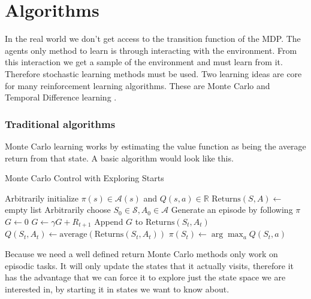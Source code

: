 \chapter{Algorithms}\label{C:algorithms}

In the real world we don't get access to the transition function of the MDP. The agents only method to learn is through interacting with the environment. From this interaction we get a sample of the environment and must learn from it. Therefore stochastic learning methods must be used. Two learning ideas are core for many reinforcement learning algorithms. These are Monte Carlo \cite{suttonReinforcementLearningSecond2018} and Temporal Difference learning \cite{suttonTemporalCreditAssignment1984} \cite{suttonLearningPredictMethods1988}.

\subsection{Traditional algorithms}

Monte Carlo learning works by estimating the value function as being the average return from that state.  A basic algorithm would look like this.

\begin{algorithm}
\caption{Monte Carlo Control with Exploring Starts}
\begin{algorithmic}[1]
\State Arbitrarily initialize $\pi(s) \in \mathcal{A}(s)$ and $Q(s,a) \in \mathbb{R}$
\State $\text{Returns}(S,A) \gets$ empty list
    \State Arbitrarily choose $S_0 \in \mathcal{S}, A_0 \in \mathcal{A}$
    \State Generate an episode by following $\pi$
    \State $G \gets 0$
        \State $G \gets \gamma G + R_{t+1}$
            \State Append $G$ to $\text{Returns}(S_t, A_t)$
            \State $Q(S_t, A_t) \gets \text{average}(\text{Returns}(S_t, A_t))$
            \State $\pi(S_t) \gets \arg\max_{a} Q(S_t, a)$
        \EndIf
    \EndFor
\EndFor
\end{algorithmic}
\end{algorithm}

Because we need a well defined return Monte Carlo methods only work on episodic tasks. It will only update the states that it actually visits, therefore it has the advantage that we can force it to explore just the state space we are interested in, by starting it in states we want to know about.

